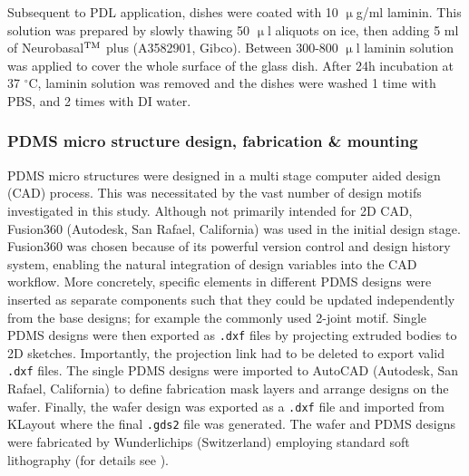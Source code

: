 Subsequent to PDL application, dishes were coated with 10 $\upmu$g/ml laminin.
This solution was prepared by slowly thawing 50 $\upmu$l aliquots on ice, then
adding 5 ml of Neurobasal$\rm^{TM}$ plus (A3582901, Gibco). Between 300-800
$\upmu$l laminin solution was applied to cover the whole surface of the glass
dish. After 24h incubation at 37 $^{\circ}$C, laminin solution was removed and
the dishes were washed 1 time with PBS, and 2 times with DI water.




\subsubsection{PDMS micro structure design, fabrication \& mounting}
\label{pdms structures assembly}
PDMS micro structures were designed in a multi stage computer aided design (CAD)
process. This was necessitated by the vast number of design motifs investigated
in this study. Although not primarily intended for 2D CAD, Fusion360 (Autodesk,
San Rafael, California) was used in the initial design stage. Fusion360 was
chosen because of its powerful version control and design history system,
enabling the natural integration of design variables into the CAD workflow. More
concretely, specific elements in different PDMS designs were inserted as
separate components such that they could be updated independently from the base
designs; for example the commonly used 2-joint motif. Single PDMS designs were
then exported as \verb|.dxf| files by projecting extruded bodies to 2D sketches.
Importantly, the projection link had to be deleted to export valid \verb|.dxf|
files. The single PDMS designs were imported to AutoCAD (Autodesk, San Rafael,
California) to define fabrication mask layers and arrange designs on the wafer.
Finally, the wafer design was exported as a \verb|.dxf| file and imported from
KLayout where the final \verb|.gds2| file was generated. The wafer and PDMS
designs were fabricated by Wunderlichips (Switzerland) employing standard soft
lithography (for details see \cite{forro}). \\


